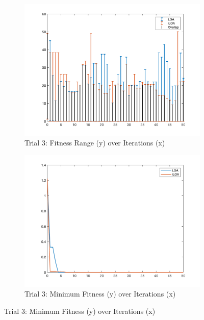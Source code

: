 \begin{figure}
  \begin{subfigure}[b]{0.4\textwidth}
    \includegraphics[width=\textwidth]{img/bars/f3/3}
    \caption{ \scriptsize Trial 3: Fitness Range (y) over Iterations (x)}
    \label{fig:f3-b-3}
  \end{subfigure}
  \begin{subfigure}[b]{0.4\textwidth}
    \includegraphics[width=\textwidth]{img/fits/f3/3}
    \caption{ \scriptsize Trial 3: Minimum Fitness (y) over Iterations (x)}
    \label{fig:f3-f-3}
  \end{subfigure}


\end{figure}
